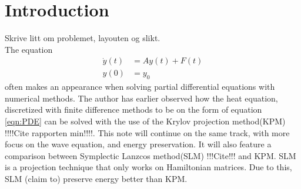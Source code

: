 \chapter{Introduction}
Skrive litt om problemet, layouten og slikt. \\
The equation 
\begin{equation} \label{eqn:PDE}
\begin{aligned}
\dot{y}(t) &= Ay(t) + F(t) \\
y(0)&= y_0
\end{aligned}
\end{equation}
often makes an appearance when solving partial differential equations with numerical methods. The author has earlier observed how the heat equation, discretized with finite difference methods to be on the form of equation \eqref{eqn:PDE} can be solved with the use of the Krylov projection method(KPM) !!!!Cite rapporten min!!!!. This note will continue on the same track, with more focus on the wave equation, and energy preservation. It will also feature a comparison between Symplectic Lanzcos method(SLM) !!!Cite!!! and KPM. SLM is a projection technique that only works on Hamiltonian matrices. Due to this, SLM (claim to) preserve energy better than KPM.  %

